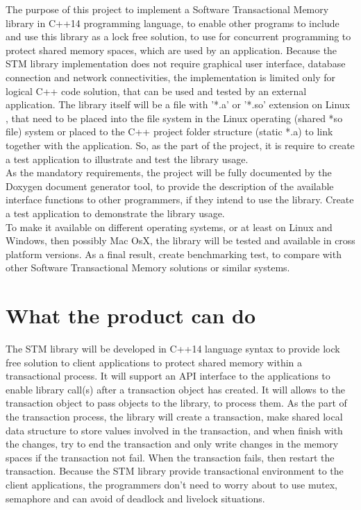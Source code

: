 \documentclass[12pt]{article}
\begin{document}
The purpose of this project to implement a Software Transactional Memory library in C++14 programming language, to enable other programs to include and use this library as a lock free solution, to use for concurrent programming to protect shared memory spaces, which are used by an application. Because the STM library implementation does not require graphical user interface, database connection and network connectivities, the implementation is limited only for logical C++ code solution, that can be used and tested by an external application. The library itself will be a file with '*.a' or '*.so' extension on Linux , that need to be placed into the file system in the Linux operating (shared *so file) system or placed to the C++ project folder structure (static *.a) to link together with the application. So, as the part of the project, it is require to create a test application to illustrate and test the library usage.\\

As the mandatory requirements, the project will be fully documented by the Doxygen document generator tool, to provide the description of the available interface functions to other programmers, if they intend to use the library. Create a test application to demonstrate the library usage.\\

To make it available on different operating systems, or at least on Linux and Windows, then possibly Mac OsX, the library will be tested and available in cross platform versions. As a final result, create benchmarking test, to compare with other Software Transactional Memory solutions or similar systems.

\clearpage
\section{What the product can do}
The STM library will be developed in C++14 language syntax to provide lock free solution to client applications to protect shared memory within a transactional process. It will support an API interface to the applications to enable library call(s) after a transaction object has created. It will allows to the transaction object to pass objects to  the library, to process them. As the part of the transaction process, the library will create a transaction, make shared local data structure to store values involved in the transaction, and when finish with the changes, try to end the transaction and only write changes in the memory spaces if the transaction not fail. When the transaction fails, then restart the transaction. Because the STM library provide transactional environment to the client applications, the programmers don't need to worry about to use mutex, semaphore and can avoid of deadlock and livelock situations.
\end{document}

